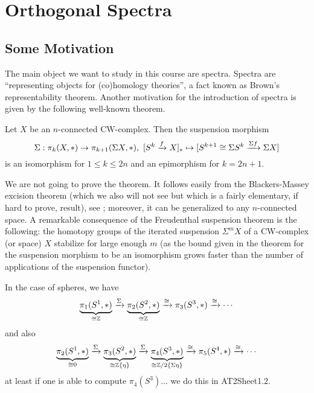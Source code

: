 
\renewcommand{\thechapter}{\Roman{chapter}}

\chapter{Orthogonal Spectra}

\section*{Some Motivation}


The main object we want to study in this course are spectra. Spectra are \enquote{representing objects for (co)homology theories}, a fact known as Brown's representability theorem. Another motivation for the introduction of spectra is given by the following well-known theorem.

\begin{theorem**}
Let $X$ be an $n$-connected CW-complex. Then the suspension morphism
\[\Sigma:\pi_k(X,*)\to\pi_{k+1}(\Sigma X,*),\ [S^k\xto{f}X]_*\mapsto[S^{k+1}\cong\Sigma S^k\xto{\Sigma f}\Sigma X]\]
is an isomorphism for $1\leq k\leq2n$ and an epimorphism for $k=2n+1$.
\end{theorem**}

We are not going to prove the theorem. It follows easily from the Blackers-Massey excision theorem (which we also will not see but which is a fairly elementary, if hard to prove, result), see \cite[\nopp theorem 4.23, corollary 4.24]{hatcher}; moreover, it can be generalized to any $n$-connected space. A remarkable consequence of the Freudenthal suspension theorem is the following: the homotopy groups of the iterated suspension $\Sigma^m X$ of a CW-complex (or space) $X$ stabilize for large enough $m$ (as the bound given in the theorem for the suspension morphism to be an isomorphism grows faster than the number of applications of the suspension functor).

\begin{example}
In the case of spheres, we have
\[\underbrace{\pi_1(S^1,*)}_{\cong{\mathbb Z}}\xrightarrow{\Sigma}\underbrace{\pi_2(S^2,*)}_{\cong{\mathbb Z}}\xrightarrow{\cong}\pi_3(S^3,*)\xrightarrow{\cong}\cdots\]
and also
\[\underbrace{\pi_2(S^1,*)}_{\cong0}\xrightarrow{\Sigma}\underbrace{\pi_3(S^2,*)}_{\cong{\mathbb Z}\{\eta\}}\xrightarrow{\Sigma}\underbrace{\pi_4(S^3,*)}_{\cong{\mathbb Z}/2\{\Sigma\eta\}}\xrightarrow{\cong}\pi_5(S^4,*)\xrightarrow{\cong}\cdots\]
at least if one is able to compute $\pi_4(S^3)$... we do this in AT2Sheet1.2.
\end{example}

